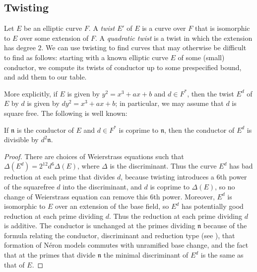 \documentclass{amsart}
\newcommand{\n}{\mathfrak{n}}
\begin{document}
\subsection{Twisting}\label{sec:twisting}

Let $E$ be an elliptic curve $F$. A \emph{twist} $E'$ of $E$ is a
curve over $F$ that is isomorphic to $E$ over some extension of $F$. A
\emph{quadratic twist} is a twist in which the extension has degree
$2$.  We can use twisting to find curves that may otherwise be
difficult to find as follows: starting with a known elliptic curve $E$
of some (small) conductor, we compute its twists of conductor up to
some prespecified bound, and add them to our table.

More explicitly, if $E$ is given by $y^2=x^3+ax+b$ and $d\in F^*$,
then the twist $E^d$ of $E$ by $d$ is given by $dy^2=x^3+ax+b$; in
particular, we may assume that $d$ is square free.  The following
is well known:
\begin{proposition}\label{twist:bound}
If $\n$ is the
conductor of $E$ and $d \in F^*$ is coprime to $\n$, then the
conductor of $E^d$ is divisible by $d^2\n$.
\end{proposition}
\begin{proof}
There are choices of Weierstrass equations such that 
$\Delta(E^d) = 2^{12} d^6 \Delta(E)$, where $\Delta$
is the discriminant.
Thus the curve $E^d$ has bad reduction at each prime that divides $d$,
because twisting introduces a $6$th power of the squarefree $d$ into
the discriminant, and $d$ is coprime to $\Delta(E)$, so no change of
Weierstrass equation can remove this $6$th power.  Moreover, $E^d$ is
isomorphic to $E$ over an extension of the base field, so $E^d$ has
potentially good reduction at each prime dividing $d$.  Thus the
reduction at each prime dividing $d$ is additive.  The conductor is
unchanged at the primes dividing $\n$ because of the formula relating
the conductor, discriminant and reduction type (see \cite[App.~C,\S15]{silverman:aec}),
that formation of N\'eron models commutes with unramified base change,
and the fact that at the primes that divide $\n$ the minimal discriminant of $E^d$ is
the same as that of $E$.
%
\end{proof}
\end{document}
